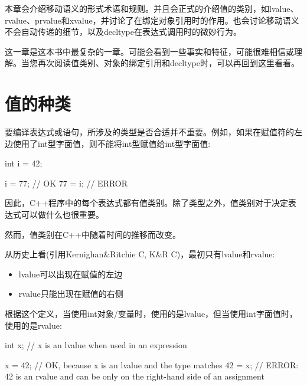 
本章会介绍移动语义的形式术语和规则。并且会正式的介绍值的类别，如lvalue、rvalue、prvalue和xvalue，并讨论了在绑定对象引用时的作用。也会讨论移动语义不会自动传递的细节，以及decltype在表达式调用时的微妙行为。\par

这一章是这本书中最复杂的一章。可能会看到一些事实和特征，可能很难相信或理解。当您再次阅读值类别、对象的绑定引用和decltype时，可以再回到这里看看。\par


\section{值的种类}

要编译表达式或语句，所涉及的类型是否合适并不重要。例如，如果在赋值符的左边使用了int型字面值，则不能将int型赋值给int型字面值:\par

\begin{codebox}[cpp]
int i = 42;

i = 77; // OK
77 = i; // ERROR
\end{codebox}

因此，C++程序中的每个表达式都有值类别。除了类型之外，值类别对于决定表达式可以做什么也很重要。\par

然而，值类别在C++中随着时间的推移而改变。\par


从历史上看(引用Kernighan\&Ritchie C, K\&R C)，最初只有lvalue和rvalue:\par

\begin{itemize}
  \item lvalue可以出现在赋值的左边
  \item rvalue只能出现在赋值的右侧
\end{itemize}

根据这个定义，当使用int对象/变量时，使用的是lvalue，但当使用int字面值时，使用的是rvalue:\par

\begin{codebox}[cpp]
int x; // x is an lvalue when used in an expression

x = 42; // OK, because x is an lvalue and the type matches
42 = x; // ERROR: 42 is an rvalue and can be only on the right-hand side of an assignment
\end{codebox}

